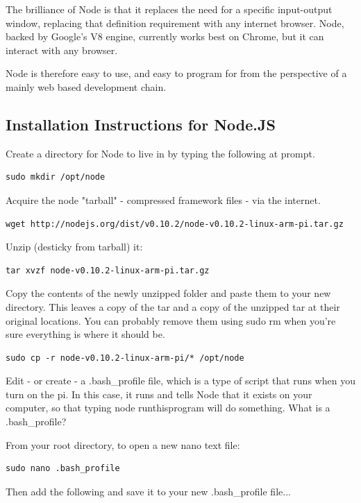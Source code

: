 The brilliance of Node is that it replaces the need for a specific input-output window, replacing that definition requirement with any internet browser. Node, backed by Google's V8 engine, currently works best on Chrome, but it can interact with any browser.

Node is therefore easy to use, and easy to program for from the perspective of a mainly web based development chain. 

\subsection{Installation Instructions for Node.JS}
Create a directory for Node to live in by typing the following at prompt.
\begin{lstlisting}
sudo mkdir /opt/node
\end{lstlisting}

Acquire the node "tarball" - compressed framework files - via the internet.

\begin{lstlisting}
wget http://nodejs.org/dist/v0.10.2/node-v0.10.2-linux-arm-pi.tar.gz
\end{lstlisting}

Unzip (desticky from tarball) it:
\begin{lstlisting}
tar xvzf node-v0.10.2-linux-arm-pi.tar.gz
\end{lstlisting}

Copy the contents of the newly unzipped folder and paste them to your new directory. This leaves a copy of the tar and a copy of the unzipped tar at their original locations. You can probably remove them using sudo rm when you're sure everything is where it should be.

\begin{lstlisting}
sudo cp -r node-v0.10.2-linux-arm-pi/* /opt/node
\end{lstlisting}

Edit - or create - a .bash_profile file, which is a type of script that runs when you turn on the pi. In this case, it runs and tells Node that it exists on your computer, so that typing node runthisprogram will do something. What is a .bash_profile?

From your root directory, to open a new nano text file:
\begin{lstlisting}
sudo nano .bash_profile 
\end{lstlisting}

Then add the following and save it to your new .bash_profile file...


